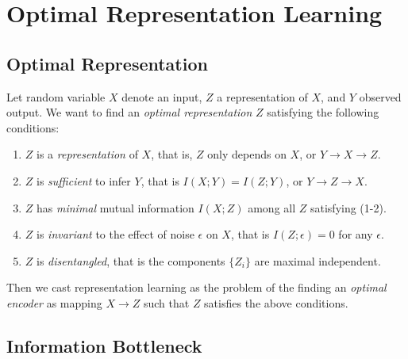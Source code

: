 \documentclass[11pt]{article}
\begin{document}
\section{Optimal Representation Learning}

\subsection*{Optimal Representation}
Let random variable $X$ denote an input, $Z$ a representation of $X$, and $Y$ observed output. We want to find an \emph{optimal representation} $Z$ satisfying the following conditions:

\begin{enumerate}
	\item $Z$ is a \emph{representation} of $X$, that is, $Z$ only depends on $X$, or $Y\rightarrow X \rightarrow Z$.
	\item $Z$ is \emph{sufficient} to infer $Y$, that is $I(X;Y) = I(Z;Y)$, or $Y\rightarrow Z \rightarrow X$.
	\item $Z$ has \emph{minimal} mutual information $I(X;Z)$ among all $Z$ satisfying (1-2).
	\item $Z$ is \emph{invariant} to the effect of noise $\epsilon$ on $X$, that is $I(Z;\epsilon)=0$ for any $\epsilon$.
	\item $Z$ is \emph{disentangled}, that is the components $\{Z_i\}$ are maximal independent.
\end{enumerate}

Then we cast representation learning as the problem of the finding an \emph{optimal encoder} as mapping $X\rightarrow Z$ such that $Z$ satisfies the above conditions.

\subsection*{Information Bottleneck}
\end{document}
